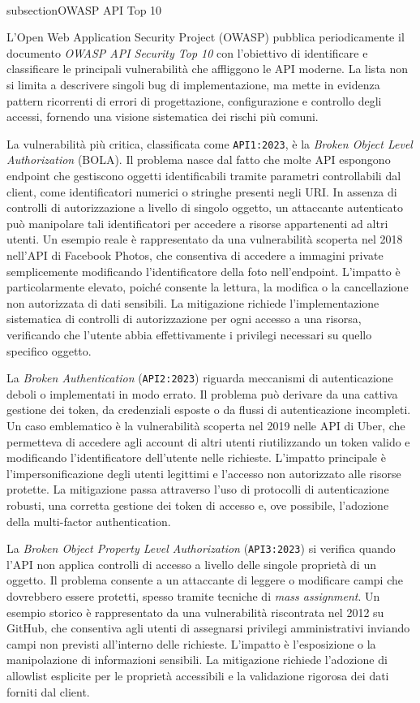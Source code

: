 \\subsection{OWASP API Top 10}

L’Open Web Application Security Project (OWASP) pubblica periodicamente il documento \emph{OWASP API Security Top 10} con l’obiettivo di identificare e classificare le principali vulnerabilità che affliggono le API moderne. La lista non si limita a descrivere singoli bug di implementazione, ma mette in evidenza pattern ricorrenti di errori di progettazione, configurazione e controllo degli accessi, fornendo una visione sistematica dei rischi più comuni.

La vulnerabilità più critica, classificata come \texttt{API1:2023}, è la \emph{Broken Object Level Authorization} (BOLA). Il problema nasce dal fatto che molte API espongono endpoint che gestiscono oggetti identificabili tramite parametri controllabili dal client, come identificatori numerici o stringhe presenti negli URI. In assenza di controlli di autorizzazione a livello di singolo oggetto, un attaccante autenticato può manipolare tali identificatori per accedere a risorse appartenenti ad altri utenti. Un esempio reale è rappresentato da una vulnerabilità scoperta nel 2018 nell’API di Facebook Photos, che consentiva di accedere a immagini private semplicemente modificando l’identificatore della foto nell’endpoint. L’impatto è particolarmente elevato, poiché consente la lettura, la modifica o la cancellazione non autorizzata di dati sensibili. La mitigazione richiede l’implementazione sistematica di controlli di autorizzazione per ogni accesso a una risorsa, verificando che l’utente abbia effettivamente i privilegi necessari su quello specifico oggetto.

La \emph{Broken Authentication} (\texttt{API2:2023}) riguarda meccanismi di autenticazione deboli o implementati in modo errato. Il problema può derivare da una cattiva gestione dei token, da credenziali esposte o da flussi di autenticazione incompleti. Un caso emblematico è la vulnerabilità scoperta nel 2019 nelle API di Uber, che permetteva di accedere agli account di altri utenti riutilizzando un token valido e modificando l’identificatore dell’utente nelle richieste. L’impatto principale è l’impersonificazione degli utenti legittimi e l’accesso non autorizzato alle risorse protette. La mitigazione passa attraverso l’uso di protocolli di autenticazione robusti, una corretta gestione dei token di accesso e, ove possibile, l’adozione della multi-factor authentication.

La \emph{Broken Object Property Level Authorization} (\texttt{API3:2023}) si verifica quando l’API non applica controlli di accesso a livello delle singole proprietà di un oggetto. Il problema consente a un attaccante di leggere o modificare campi che dovrebbero essere protetti, spesso tramite tecniche di \emph{mass assignment}. Un esempio storico è rappresentato da una vulnerabilità riscontrata nel 2012 su GitHub, che consentiva agli utenti di assegnarsi privilegi amministrativi inviando campi non previsti all’interno delle richieste. L’impatto è l’esposizione o la manipolazione di informazioni sensibili. La mitigazione richiede l’adozione di allowlist esplicite per le proprietà accessibili e la validazione rigorosa dei dati forniti dal client.

